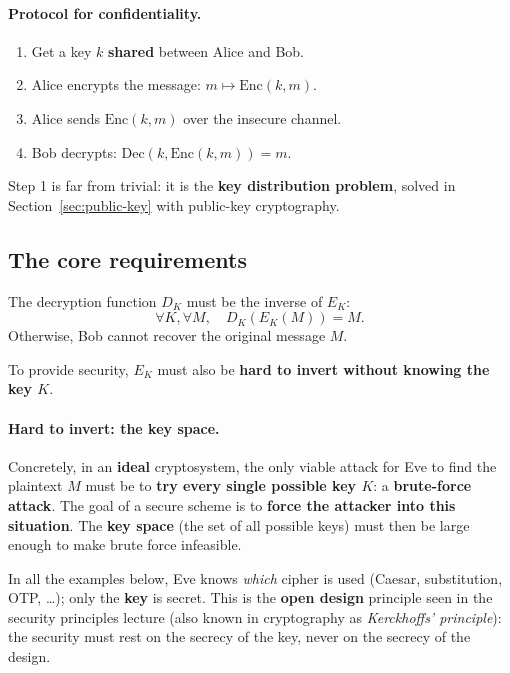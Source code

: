 \paragraph{Protocol for confidentiality.}
\begin{enumerate}
    \item Get a key $k$ \textbf{shared} between Alice and Bob.
    \item Alice encrypts the message: $m \mapsto \mathrm{Enc}(k, m)$.
    \item Alice sends $\mathrm{Enc}(k, m)$ over the insecure channel.
    \item Bob decrypts: $\mathrm{Dec}(k, \mathrm{Enc}(k,m)) = m$.
\end{enumerate}
Step 1 is far from trivial: it is the \textbf{key distribution problem}, solved in Section~\ref{sec:public-key} with public-key cryptography.

\subsection{The core requirements}

\begin{definition}
The decryption function $D_K$ must be the inverse of $E_K$:
\[
\forall K, \forall M, \quad D_K(E_K(M)) = M.
\]
Otherwise, Bob cannot recover the original message $M$.
\end{definition}

\begin{definition}
To provide security, $E_K$ must also be \textbf{hard to invert without knowing the key $K$}.
\end{definition}

\paragraph{Hard to invert: the key space.} Concretely, in an \textbf{ideal} cryptosystem, the only viable attack for Eve to find the plaintext $M$ must be to \textbf{try every single possible key $K$}: a \textbf{brute-force attack}. The goal of a secure scheme is to \textbf{force the attacker into this situation}. The \textbf{key space} (the set of all possible keys) must then be large enough to make brute force infeasible.

\begin{remark}
In all the examples below, Eve knows \emph{which} cipher is used (Caesar, substitution, OTP, \dots); only the \textbf{key} is secret. This is the \textbf{open design} principle seen in the security principles lecture (also known in cryptography as \emph{Kerckhoffs' principle}): the security must rest on the secrecy of the key, never on the secrecy of the design.
\end{remark}

